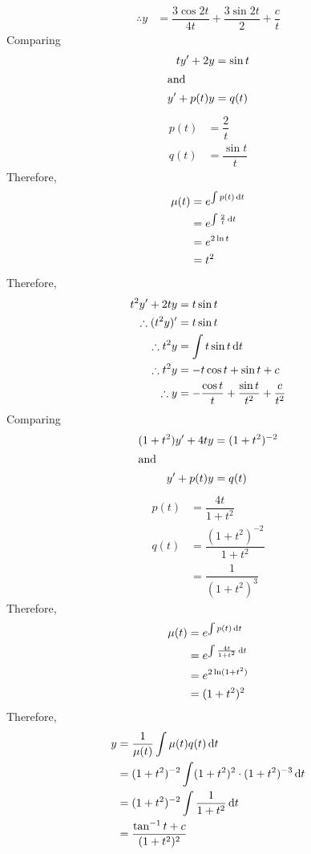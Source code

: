 \documentclass[fleqn, a4paper, 12pt, oneside]{amsart}
\theoremstyle{definition}
\theoremstyle{theorem}
\begin{document}
\begin{solution}
\begin{tasks}
\begin{align*}
				\therefore y &= \dfrac{3 \cos 2t}{4 t} + \dfrac{3 \sin 2t}{2} + \dfrac{c}{t}
			\end{align*}
		\task
			Comparing
			\begin{align*}
				t y' + 2y &= \sin t\\
				\intertext{and}
				y' + p(t) y &= q(t)
			\end{align*}
			\begin{align*}
				p(t) &= \dfrac{2}{t}\\
				q(t) &= \dfrac{\sin t}{t}
			\end{align*}
			Therefore,
			\begin{align*}
				\mu(t) &= e^{\int p(t) \dif t}\\
				&= e^{\int \frac{2}{t} \dif t}\\
				&= e^{2 \ln t}\\
				&= t^2
			\end{align*}
			Therefore,
			\begin{align*}
				t^2 y' + 2 t y &= t \sin t\\
				\therefore (t^2 y)' &= t \sin t \\
				\therefore t^2 y &= \int t \sin t \dif t\\
				\therefore t^2 y &= - t \cos t  + \sin t + c\\
				\therefore y &= -\dfrac{\cos t}{t} + \dfrac{\sin t}{t^2} + \dfrac{c}{t^2}
			\end{align*}
		\task
			Comparing
			\begin{align*}
				(1 + t^2) y' + 4 t y &= (1 + t^2)^{-2}\\
				\intertext{and}
				y' + p(t) y &= q(t)
			\end{align*}
			\begin{align*}
				p(t) &= \dfrac{4t}{1 + t^2}\\
				q(t) &= \dfrac{(1 + t^2)^{-2}}{1 + t^2}\\
				&= \dfrac{1}{(1 + t^2)^3}
			\end{align*}
			Therefore,
			\begin{align*}
				\mu(t) &= e^{\int p(t) \dif t}\\
				&= e^{\int \frac{4t}{1 + t^2} \dif t}\\
				&= e^{2 \ln (1 + t^2)}\\
				&= (1 + t^2)^2
			\end{align*}
			Therefore,
			\begin{align*}
				y &= \dfrac{1}{\mu(t)} \int \mu(t) q(t) \dif t\\
				&= (1 + t^2)^{-2} \int (1 + t^2)^2 \cdot (1 + t^2)^{-3} \dif t\\
				&= (1 + t^2)^{-2} \int \dfrac{1}{1 + t^2} \dif t\\
				&= \dfrac{\tan^{-1} t + c}{(1 + t^2)^2}
			\end{align*}
	\end{tasks}
\end{solution}
\end{document}
